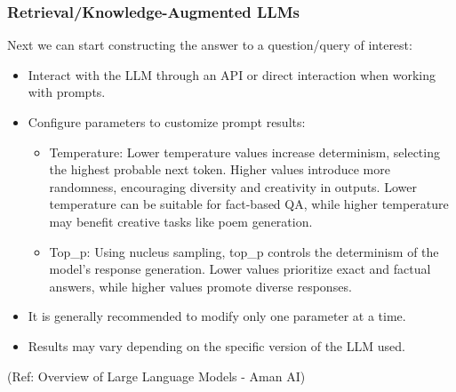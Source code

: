 \begin{frame}[fragile]\frametitle{Retrieval/Knowledge-Augmented LLMs}

Next we can start constructing the answer to a question/query of interest:

\begin{itemize}
\item Interact with the LLM through an API or direct interaction when working with prompts.
\item Configure parameters to customize prompt results:

\begin{itemize}
\item Temperature: Lower temperature values increase determinism, selecting the highest probable next token. Higher values introduce more randomness, encouraging diversity and creativity in outputs. Lower temperature can be suitable for fact-based QA, while higher temperature may benefit creative tasks like poem generation.
\item Top\_p: Using nucleus sampling, top\_p controls the determinism of the model's response generation. Lower values prioritize exact and factual answers, while higher values promote diverse responses.
\end{itemize}

\item It is generally recommended to modify only one parameter at a time.
\item Results may vary depending on the specific version of the LLM used.
\end{itemize}

{\tiny (Ref: Overview of Large Language Models - Aman AI)}

\end{frame}

